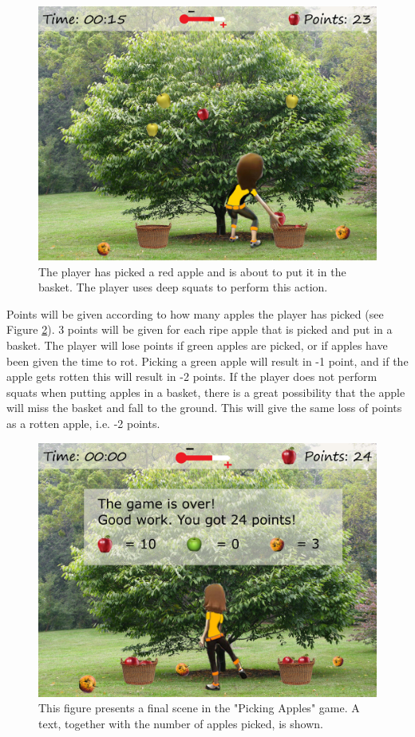 \begin{figure} [H]
\centering
\includegraphics[scale=0.07]{squatppletreeEng.jpg}
\caption[Picking apples - squats]{The player has picked a red apple and is about to put it in the basket. The player uses deep squats to perform this action.}
\label{fig:appleSquat}
\end{figure}

Points will be given according to how many apples the player has picked (see Figure \ref{fig:appleOver}). 3 points will be given for each ripe apple that is picked and put in a basket. The player will lose points if green apples are picked, or if apples have been given the time to rot. Picking a green apple will result in -1 point, and if the apple gets rotten this will result in -2 points. If the player does not perform squats when putting apples in a basket, there is a great possibility that the apple will miss the basket and fall to the ground. This will give the same loss of points as a rotten apple, i.e. -2 points.       

\begin{figure} [H]
\centering
\includegraphics[scale=0.07]{appletreeendEng.jpg}
\caption[Picking apples - points]{This figure presents a final scene in the "Picking Apples" game. A text, together with the number of apples picked, is shown.}
\label{fig:appleOver}
\end{figure}

